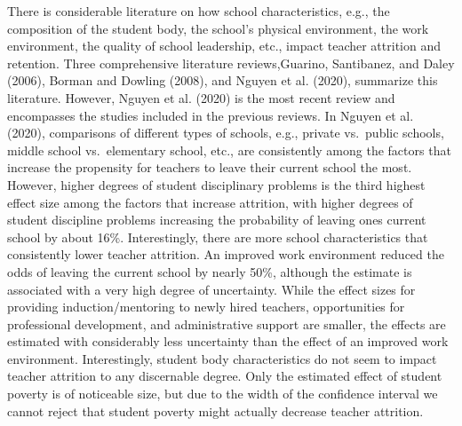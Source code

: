 \documentclass[
]{article}
\begin{document}
There is considerable literature on how school characteristics, e.g., the composition of the student body, the school's physical environment, the work environment, the quality of school leadership, etc., impact teacher attrition and retention. Three comprehensive literature reviews,Guarino, Santibanez, and Daley (2006), Borman and Dowling (2008), and Nguyen et al. (2020), summarize this literature. However, Nguyen et al. (2020) is the most recent review and encompasses the studies included in the previous reviews. In Nguyen et al. (2020), comparisons of different types of schools, e.g., private vs.~public schools, middle school vs.~elementary school, etc., are consistently among the factors that increase the propensity for teachers to leave their current school the most. However, higher degrees of student disciplinary problems is the third highest effect size among the factors that increase attrition, with higher degrees of student discipline problems increasing the probability of leaving ones current school by about 16\%. Interestingly, there are more school characteristics that consistently lower teacher attrition. An improved work environment reduced the odds of leaving the current school by nearly 50\%, although the estimate is associated with a very high degree of uncertainty. While the effect sizes for providing induction/mentoring to newly hired teachers, opportunities for professional development, and administrative support are smaller, the effects are estimated with considerably less uncertainty than the effect of an improved work environment.
Interestingly, student body characteristics do not seem to impact teacher attrition to any discernable degree. Only the estimated effect of student poverty is of noticeable size, but due to the width of the confidence interval we cannot reject that student poverty might actually decrease teacher attrition.
\end{document}
